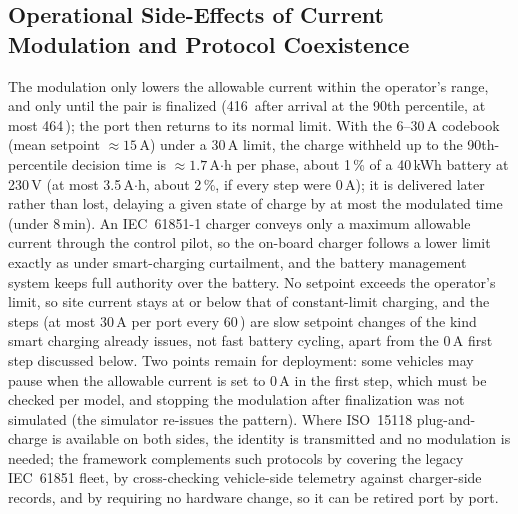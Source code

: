 \documentclass{ieeeaccess}
\newif\ifhighlight \highlightfalse
\DeclareRobustCommand{\revised}[1]{\ifhighlight{\color{blue}#1}\else{\color{.}#1}\fi}
\begin{document}
    \subsection{\revised{Operational Side-Effects of Current Modulation and Protocol Coexistence}}
    \revised{The modulation only lowers the allowable current within the operator's range, and only until the pair is finalized (416\,\text{sec} after arrival at the 90th percentile, at most 464\,\text{sec}); the port then returns to its normal limit.
    With the 6--30\,A codebook (mean setpoint $\approx 15$\,A) under a 30\,A limit, the charge withheld up to the 90th-percentile decision time is $\approx 1.7$\,A$\cdot$h per phase, about 1\,\% of a 40\,kWh battery at 230\,V (at most 3.5\,A$\cdot$h, about 2\,\%, if every step were 0\,A); it is delivered later rather than lost, delaying a given state of charge by at most the modulated time (under 8\,min).
    An IEC~61851-1 charger conveys only a maximum allowable current through the control pilot, so the on-board charger follows a lower limit exactly as under smart-charging curtailment, and the battery management system keeps full authority over the battery.
    No setpoint exceeds the operator's limit, so site current stays at or below that of constant-limit charging, and the steps (at most 30\,A per port every 60\,\text{sec}) are slow setpoint changes of the kind smart charging already issues, not fast battery cycling, apart from the 0\,A first step discussed below.
    Two points remain for deployment: some vehicles may pause when the allowable current is set to 0\,A in the first step, which must be checked per model, and stopping the modulation after finalization was not simulated (the simulator re-issues the pattern).
    Where ISO~15118 plug-and-charge is available on both sides, the identity is transmitted and no modulation is needed; the framework complements such protocols by covering the legacy IEC~61851 fleet, by cross-checking vehicle-side telemetry against charger-side records, and by requiring no hardware change, so it can be retired port by port.}
\end{document}
